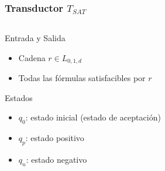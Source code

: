 \documentclass{beamer}
\begin{document}
\begin{frame}
\begin{columns}
\begin{column}{0.6\textwidth}
\begin{figure}[h]
\begin{otherlanguage}{english}
                \end{otherlanguage}
            \end{figure}
        \end{column}
        
    \end{columns}
    
    
\end{frame}

\begin{frame}
    \frametitle{Transductor $T_{SAT}$}
    
    \begin{columns}
        \begin{column}{0.38\textwidth}
            Entrada y Salida
            \begin{itemize}
                \item Cadena $r\in L_{0,1,d}$
                \item Todas las fórmulas satisfacibles por $r$
            \end{itemize}
            
            \pause
            \vspace{0.5cm}
            
            Estados
            \begin{itemize}
                \item $q_0$: estado inicial (estado de aceptación)
                \item $q_p$: estado positivo
                \item $q_n$: estado negativo
            \end{itemize}
            \pause
        \end{column}
        
        \begin{column}{0.6\textwidth}
            
            \begin{figure}[h]
                \centering  \begin{otherlanguage}{english}
\end{otherlanguage}
\end{figure}
\end{column}
\end{columns}
\end{frame}
\end{document}

